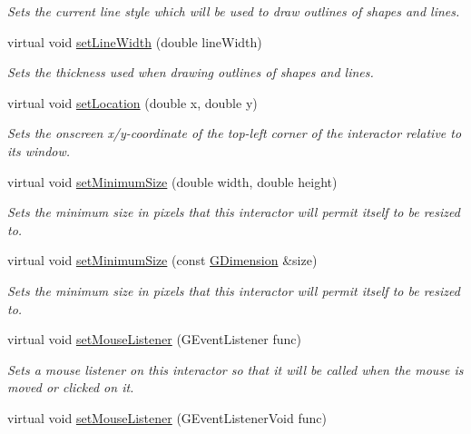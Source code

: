 \begin{DoxyCompactItemize}
\begin{DoxyCompactList}\small\item\em Sets the current line style which will be used to draw outlines of shapes and lines. \end{DoxyCompactList}\item 
virtual void \mbox{\hyperlink{classGDrawingSurface_afd6a47c6ea6a1f85ca05a65ba3ff3477}{set\+Line\+Width}} (double line\+Width)
\begin{DoxyCompactList}\small\item\em Sets the thickness used when drawing outlines of shapes and lines. \end{DoxyCompactList}\item 
virtual void \mbox{\hyperlink{classGInteractor_a04594e8ba9b98513a64f1da00dcae18c}{set\+Location}} (double x, double y)
\begin{DoxyCompactList}\small\item\em Sets the onscreen x/y-\/coordinate of the top-\/left corner of the interactor relative to its window. \end{DoxyCompactList}\item 
virtual void \mbox{\hyperlink{classGInteractor_a0cf428e207b7f22cc08138a90b1b87b2}{set\+Minimum\+Size}} (double width, double height)
\begin{DoxyCompactList}\small\item\em Sets the minimum size in pixels that this interactor will permit itself to be resized to. \end{DoxyCompactList}\item 
virtual void \mbox{\hyperlink{classGInteractor_a3b1046117ac6cb7abe467e00ba8a81f4}{set\+Minimum\+Size}} (const \mbox{\hyperlink{structGDimension}{G\+Dimension}} \&size)
\begin{DoxyCompactList}\small\item\em Sets the minimum size in pixels that this interactor will permit itself to be resized to. \end{DoxyCompactList}\item 
virtual void \mbox{\hyperlink{classGInteractor_a37d8dbc943f59920f705b0104f60bde2}{set\+Mouse\+Listener}} (G\+Event\+Listener func)
\begin{DoxyCompactList}\small\item\em Sets a mouse listener on this interactor so that it will be called when the mouse is moved or clicked on it. \end{DoxyCompactList}\item 
virtual void \mbox{\hyperlink{classGInteractor_aea7f647ea62d59f71b5fad6aa65eeaf9}{set\+Mouse\+Listener}} (G\+Event\+Listener\+Void func)

\end{DoxyCompactItemize}
